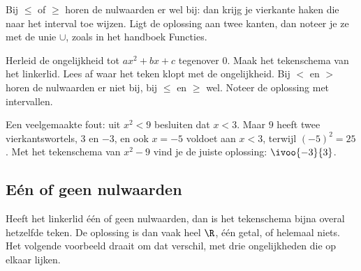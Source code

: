 Bij $\leqslant$ of $\geqslant$ horen de nulwaarden er wel bij: dan krijg je vierkante haken die naar het interval toe wijzen. Ligt de oplossing aan twee kanten, dan noteer je ze met de unie $\cup$, zoals in het handboek Functies.


\begin{werkwijze}
Herleid de ongelijkheid tot $ax^2 + bx + c$ tegenover $0$. Maak het tekenschema van het linkerlid. Lees af waar het teken klopt met de ongelijkheid. Bij $<$ en $>$ horen de nulwaarden er niet bij, bij $\leqslant$ en $\geqslant$ wel. Noteer de oplossing met intervallen.
\end{werkwijze}

Een veelgemaakte fout: uit $x^2 < 9$ besluiten dat $x < 3$. Maar $9$ heeft twee vierkantswortels, $3$ en $-3$, en ook $x = -5$ voldoet aan $x < 3$, terwijl $(-5)^2 = 25$. Met het tekenschema van $x^2 - 9$ vind je de juiste oplossing: $\ivoo{-3}{3}$.

\begin{oefeningen}

\end{oefeningen}

\subsection{Eén of geen nulwaarden}

Heeft het linkerlid één of geen nulwaarden, dan is het tekenschema bijna overal hetzelfde teken. De oplossing is dan vaak heel $\R$, één getal, of helemaal niets. Het volgende voorbeeld draait om dat verschil, met drie ongelijkheden die op elkaar lijken.

